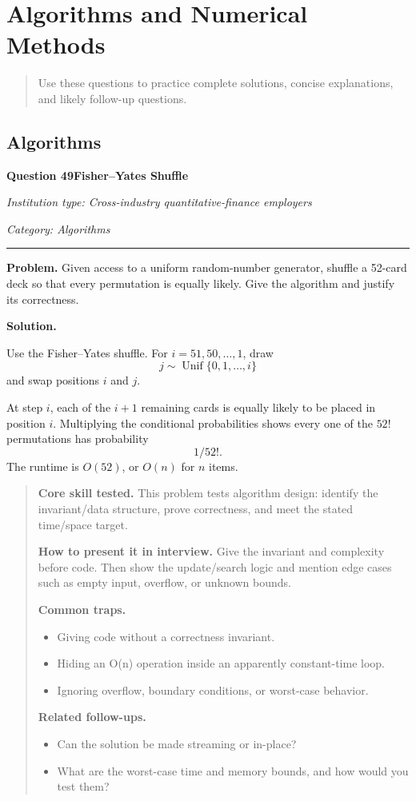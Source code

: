 \documentclass[11pt,letterpaper,openany]{book}
\newcommand{\ChapterIntro}[1]{%
  \begin{quote}\small #1\end{quote}%
}
\newenvironment{EditorialNote}
  {\begin{quote}\small\setlength{\parskip}{0.25em}}
  {\end{quote}}
\newcommand{\QuestionSpacer}{\vspace{0.4em}}
\newcommand{\FoundationQuestionHeader}[3]{%
  \vspace{1.0em}%
  {\large\bfseries #1\enspace #2\par}%
  {\small\itshape Institution type: Cross-industry quantitative-finance employers\par}%
  {\small\itshape Category: #3\par}%
  \vspace{0.25em}\hrule\vspace{0.45em}%
}
\begin{document}
\section{Algorithms and Numerical Methods}

\ChapterIntro{Use these questions to practice complete solutions, concise explanations, and likely follow-up questions.}

\subsection{Algorithms}

\FoundationQuestionHeader{Question 49}{Fisher--Yates Shuffle}{Algorithms}

\textbf{Problem.} Given access to a uniform random-number generator, shuffle a 52-card deck so that every permutation is equally likely. Give the algorithm and justify its correctness.


\textbf{Solution.}

Use the Fisher--Yates shuffle. For \(i=51,50,\ldots,1\), draw
\[
j\sim\operatorname{Unif}\{0,1,\ldots,i\}
\]
and swap positions \(i\) and \(j\).

At step \(i\), each of the \(i+1\) remaining cards is equally likely to be placed in position \(i\). Multiplying the conditional probabilities shows every one of the \(52!\) permutations has probability
\[
\boxed{1/52!}.
\]
The runtime is \(O(52)\), or \(O(n)\) for \(n\) items.


\begin{EditorialNote}


\textbf{Core skill tested.} This problem tests algorithm design: identify the invariant/data structure, prove correctness, and meet the stated time/space target.


\textbf{How to present it in interview.} Give the invariant and complexity before code. Then show the update/search logic and mention edge cases such as empty input, overflow, or unknown bounds.


\textbf{Common traps.}
\begin{itemize}
\item Giving code without a correctness invariant.
\item Hiding an O(n) operation inside an apparently constant-time loop.
\item Ignoring overflow, boundary conditions, or worst-case behavior.
\end{itemize}


\textbf{Related follow-ups.}
\begin{itemize}
\item Can the solution be made streaming or in-place?
\item What are the worst-case time and memory bounds, and how would you test them?
\end{itemize}


\end{EditorialNote}
\QuestionSpacer
\end{document}
